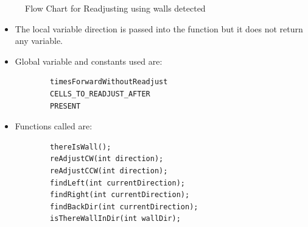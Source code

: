 \documentclass[11pt]{article}
\begin{document}
\begin{itemize}
\begin{figure}[htp]
\caption{Flow Chart for Readjusting using walls detected}
\label{}
\end{figure}
	\begin{itemize}
	\item The local variable direction is passed into the function but it does not return any variable.
	\item Global variable and constants used are:
	\begin{verbatim}
		timesForwardWithoutReadjust
		CELLS_TO_READJUST_AFTER
		PRESENT
	\end{verbatim}
	\item Functions called are:
	\begin{verbatim}
		thereIsWall();
		reAdjustCW(int direction);
		reAdjustCCW(int direction);
		findLeft(int currentDirection);
		findRight(int currentDirection);
		findBackDir(int currentDirection);
		isThereWallInDir(int wallDir);
	\end{verbatim}
	\end{itemize}
\end{itemize}
\newpage

\end{document}
